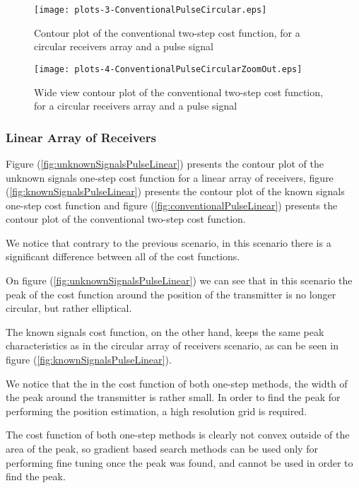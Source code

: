 \begin{figure}
\begin{center}
\texttt{[image: plots-3-ConventionalPulseCircular.eps]} 
\end{center}
\caption{Contour plot of the conventional two-step cost function, for a circular receivers array and a pulse signal}
\label{fig:conventionalPulseCircular}
\end{figure}

\begin{figure}
\begin{center}
\texttt{[image: plots-4-ConventionalPulseCircularZoomOut.eps]} 
\end{center}
\caption{Wide view contour plot of the conventional two-step cost function, for a circular receivers array and a pulse signal}
\label{fig:zoomoutConventionalPulseCircular}
\end{figure}

\subsubsection*{Linear Array of Receivers}
Figure (\ref{fig:unknownSignalsPulseLinear}) presents the contour plot of the unknown signals one-step cost function for a linear array of receivers, figure (\ref{fig:knownSignalsPulseLinear}) presents the contour plot of the known signals one-step cost function and figure (\ref{fig:conventionalPulseLinear}) presents the contour plot of the conventional two-step cost function.

We notice that contrary to the previous scenario, in this scenario there is a significant difference between all of the cost functions.

On figure (\ref{fig:unknownSignalsPulseLinear}) we can see that in this scenario the peak of the cost function around the position of the transmitter is no longer circular, but rather elliptical.

The known signals cost function, on the other hand, keeps the same peak characteristics as in the circular array of receivers scenario, as can be seen in figure (\ref{fig:knownSignalsPulseLinear}).

We notice that the in the cost function of both one-step methods, the width of the peak around the transmitter is rather small. In order to find the peak for performing the position estimation, a high resolution grid is required. 

The cost function of both one-step methods is clearly not convex outside of the area of the peak, so gradient based search methods can be used only for performing fine tuning once the peak was found, and cannot be used in order to find the peak.

